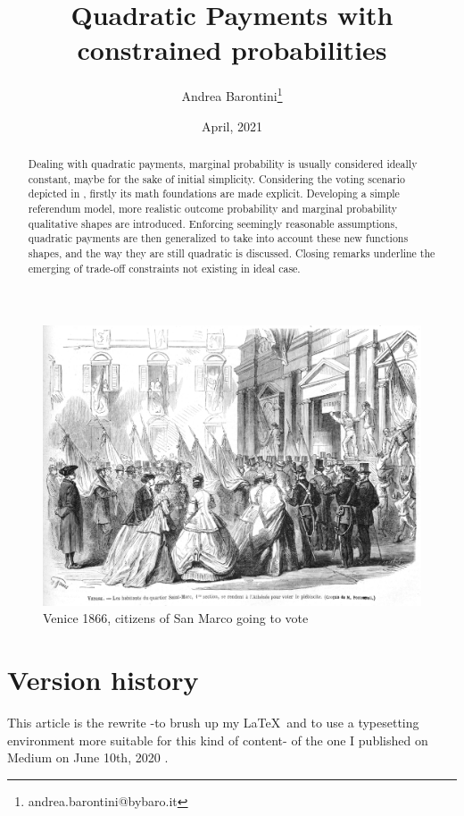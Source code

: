 \documentclass[10pt,a4paper]{article}
\author{Andrea Barontini\thanks{andrea.barontini@bybaro.it}}
\title{Quadratic Payments with constrained probabilities}
\date{April, 2021}
\begin{document}
	\maketitle
	\begin{figure}[h!]
		\includegraphics[width=\linewidth]{FIG/venice.jpg}
		\caption{Venice 1866, citizens of San Marco going to vote \cite{Venice}}
		\label{fig:venice}
	\end{figure}
	\begin{abstract}
		Dealing with quadratic payments, marginal probability is usually considered ideally constant, maybe for the sake of initial simplicity. Considering the voting scenario depicted in \cite{Vitalik}, firstly its math foundations are made explicit. Developing a simple referendum model, more realistic outcome probability and marginal probability qualitative shapes are introduced. Enforcing seemingly reasonable assumptions, quadratic payments are then generalized to take into account these new functions shapes, and the way they are still quadratic is discussed. Closing remarks underline the emerging of trade-off constraints not existing in ideal case.
	\end{abstract}

	\newpage
	\tableofcontents
	\listoffigures
	\listoftables
	\printbibliography
	
	\newpage
	\section{Version history}
	This article is the rewrite -to brush up my \LaTeX \ and to use a typesetting environment more suitable for this kind of content- of the one I published on Medium on June 10th, 2020 \cite{Medium}.
	
\end{document}

